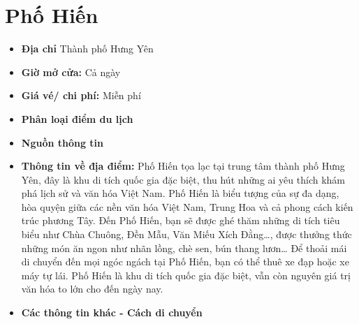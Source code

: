 \documentclass{article}
\begin{document}
\section{Phố Hiến}
\begin{itemize}
    \item{\textbf{Địa chỉ}} Thành phố Hưng Yên

    \item{\textbf{Giờ mở cửa:}} Cả ngày

    \item{\textbf{Giá vé/ chi phí:}} Miễn phí

    \item{\textbf{Phân loại điểm du lịch}} 

    \item{\textbf{Nguồn thông tin}} 

    \item{\textbf{Thông tin về địa điểm:}} Phố Hiến tọa lạc tại trung tâm thành phố Hưng Yên, đây là khu di tích quốc gia đặc biệt, thu hút những ai yêu thích khám phá lịch sử và văn hóa Việt Nam. Phố Hiến là biểu tượng của sự đa dạng, hòa quyện giữa các nền văn hóa Việt Nam, Trung Hoa và cả phong cách kiến trúc phương Tây. Đến Phố Hiến, bạn sẽ được ghé thăm những di tích tiêu biểu như Chùa Chuông, Đền Mẫu, Văn Miếu Xích Đằng…, được thưởng thức những món ăn ngon như nhãn lồng, chè sen, bún thang lươn… Để thoải mái di chuyển đến mọi ngóc ngách tại Phố Hiến, bạn có thể thuê xe đạp hoặc xe máy tự lái. Phố Hiến là khu di tích quốc gia đặc biệt, vẫn còn nguyên giá trị văn hóa to lớn cho đến ngày nay.
\end{itemize}

\begin{itemize}
    \item{\textbf{Các thông tin khác - Cách di chuyển}} 
\end{itemize}
\end{document}
